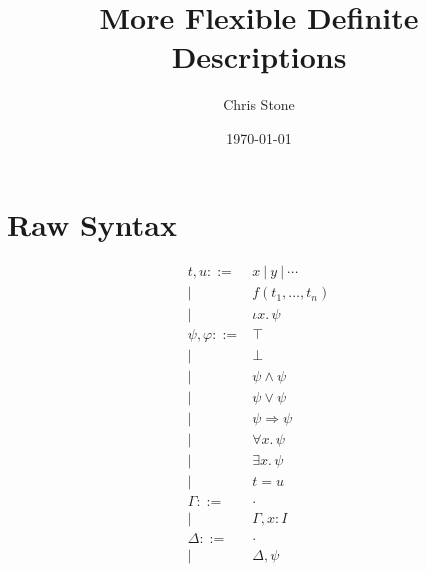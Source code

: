 \documentclass[11pt]{article}
\begin{document}
\title{More Flexible Definite Descriptions}
\author{Chris Stone}
\date{\today}
\maketitle


\section{Raw Syntax}

\newcommand{\I}{I}

\renewcommand{\t}{t}
\renewcommand{\u}{u}
\newcommand{\f}{f}
\newcommand{\x}{x}
\newcommand{\y}{y}
\newcommand{\tFun}[3]{#1({#2}_1,\ldots,{#2}_{#3})}
\newcommand{\tDesc}[3]{\iota #1.\, #3}

\newcommand{\p}{\psi}
\newcommand{\q}{\varphi}
\renewcommand{\r}{\phi}
\newcommand{\pTrue}{\top}
\newcommand{\pFalse}{\bot}
\newcommand{\pExists}[3]{\exists #1.\, #3}
\newcommand{\pForall}[3]{\forall #1.\, #3}
\newcommand{\pAnd}[2]{#1 \wedge #2}
\newcommand{\pOr}[2]{#1 \vee #2}
\newcommand{\pImply}[2]{#1 \Rightarrow #2}
\newcommand{\pEqual}[2]{#1 = #2}
\newcommand{\pIff}[2]{#1 \Longleftrightarrow #2}

\newcommand{\G}{\Gamma}
\newcommand{\D}{\Delta}
\newcommand{\emptyCtx}{\cdot}

\renewcommand{\wp}[1]{\mathop{\mathsf{wp}}(#1)}
\newcommand{\trans}[1]{\ulcorner #1 \urcorner}

\newcommand{\jwfterm}[4]{#1;#2 \vdash #3\, :\, #4}
\newcommand{\jwfprop}[3]{#1;#2 \vdash #3\, :\, \mathsf{Prop}}
\newcommand{\jpf}[3]{#1;#2 \vdash #3}

\newcommand{\wfterm}[4]{#1;#2 \,\triangleright\, #3\, :\, #4}
\newcommand{\wfprop}[3]{#1;#2 \,\triangleright\, #3\,:\, \mathsf{Prop}}
\newcommand{\pf}[3]{#1;#2 \,\triangleright\, #3}

\newcommand{\subst}[3]{#1[#2{\mapsto}#3]}

\[
\begin{array}{rl}
\t,\u ::= & \x\ |\ \y\ |\ \cdots\\
     | &\tFun{\f}{\t}{n}\\
     | &\tDesc{\x}{\I}{\p}\\[10pt]

\p,\q ::= &\pTrue\\
| & \pFalse\\
| & \pAnd{\p}{\p}\\
| & \pOr{\p}{\p}\\
| & \pImply{\p}{\p}\\
| & \pForall{\x}{\I}{\p}\\
| & \pExists{\x}{\I}{\p}\\
| & \pEqual{\t}{\u}\\[10pt]

\G ::= & \emptyCtx\\
       |& \G,\x{:}\I\\[10pt]

\D ::= & \emptyCtx\\
       |& \D,\p\\[10pt]

\end{array}
\]
\end{document}
